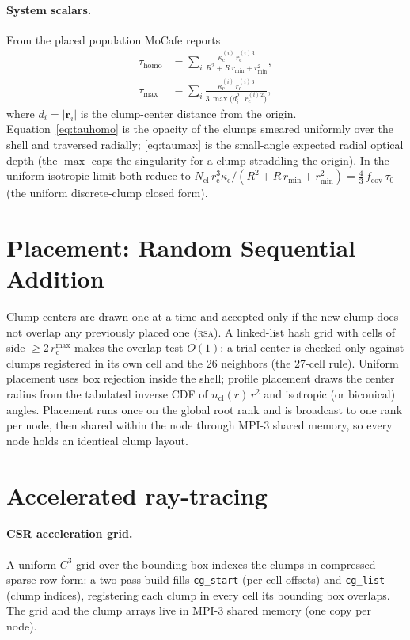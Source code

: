 \documentclass[english,a4paper]{kiseon_memo}
\newcommand{\kc}{\kappa_{\mathrm c}}
\newcommand{\rc}{r_{\mathrm c}}
\newcommand{\fcov}{f_{\mathrm{cov}}}
\newcommand{\Ncl}{N_{\mathrm{cl}}}
\begin{document}
\paragraph{System scalars.}
From the placed population MoCafe reports
\begin{align}
  \tau_{\mathrm{homo}} &= \sum_{i}
     \frac{\kc^{(i)}\,\rc^{(i)\,3}}{R^{2}+R\,r_{\min}+r_{\min}^{2}},
  \label{eq:tauhomo}\\
  \tau_{\max} &= \sum_{i}
     \frac{\kc^{(i)}\,\rc^{(i)\,3}}{3\,\max\!\big(d_{i}^{2},\,\rc^{(i)\,2}\big)},
  \label{eq:taumax}
\end{align}
where $d_{i}=|\mathbf{r}_{i}|$ is the clump-center distance from the origin.
Equation~\eqref{eq:tauhomo} is the opacity of the clumps smeared uniformly over
the shell and traversed radially; \eqref{eq:taumax} is the small-angle expected
radial optical depth (the $\max$ caps the singularity for a clump straddling
the origin).  In the uniform-isotropic limit both reduce to
$\Ncl\,\rc^{3}\kc/(R^{2}+R\,r_{\min}+r_{\min}^{2}) = \tfrac{4}{3}\,\fcov\,\tau_0$
(the uniform discrete-clump closed form).

\section{Placement: Random Sequential Addition}
Clump centers are drawn one at a time and accepted only if the new clump does
not overlap any previously placed one (\textsc{rsa}).  A linked-list hash grid
with cells of side $\ge 2\,\rc^{\max}$ makes the overlap test $O(1)$: a trial
center is checked only against clumps registered in its own cell and the 26
neighbors (the 27-cell rule).  Uniform placement uses box rejection inside the
shell; profile placement draws the center radius from the tabulated inverse CDF
of $n_{\mathrm{cl}}(r)\,r^{2}$ and isotropic (or biconical) angles.  Placement
runs once on the global root rank and is broadcast to one rank per node, then
shared within the node through MPI-3 shared memory, so every node holds an
identical clump layout.

\section{Accelerated ray-tracing}
\paragraph{CSR acceleration grid.}
A uniform $C^{3}$ grid over the bounding box indexes the clumps in
compressed-sparse-row form: a two-pass build fills \texttt{cg\_start} (per-cell
offsets) and \texttt{cg\_list} (clump indices), registering each clump in every
cell its bounding box overlaps.  The grid and the clump arrays live in MPI-3
shared memory (one copy per node).
\end{document}
